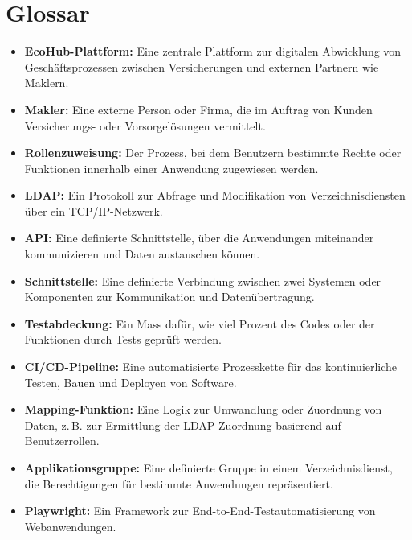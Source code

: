 \chapter*{Glossar}
\vspace{-5em}
\begin{itemize}
  \item \textbf{EcoHub-Plattform:} Eine zentrale Plattform zur digitalen Abwicklung von Geschäftsprozessen zwischen Versicherungen und externen Partnern wie Maklern.
  
  \item \textbf{Makler:} Eine externe Person oder Firma, die im Auftrag von Kunden Versicherungs- oder Vorsorgelösungen vermittelt.

  \item \textbf{Rollenzuweisung:} Der Prozess, bei dem Benutzern bestimmte Rechte oder Funktionen innerhalb einer Anwendung zugewiesen werden.

  \item \textbf{LDAP:} Ein Protokoll zur Abfrage und Modifikation von Verzeichnisdiensten über ein TCP/IP-Netzwerk.

  \item \textbf{API:} Eine definierte Schnittstelle, über die Anwendungen miteinander kommunizieren und Daten austauschen können.

  \item \textbf{Schnittstelle:} Eine definierte Verbindung zwischen zwei Systemen oder Komponenten zur Kommunikation und Datenübertragung.

  \item \textbf{Testabdeckung:} Ein Mass dafür, wie viel Prozent des Codes oder der Funktionen durch Tests geprüft werden.

  \item \textbf{CI/CD-Pipeline:} Eine automatisierte Prozesskette für das kontinuierliche Testen, Bauen und Deployen von Software.

  \item \textbf{Mapping-Funktion:} Eine Logik zur Umwandlung oder Zuordnung von Daten, z.\,B. zur Ermittlung der LDAP-Zuordnung basierend auf Benutzerrollen.

  \item \textbf{Applikationsgruppe:} Eine definierte Gruppe in einem Verzeichnisdienst, die Berechtigungen für bestimmte Anwendungen repräsentiert.

  \item \textbf{Playwright:} Ein Framework zur End-to-End-Testautomatisierung von Webanwendungen.


\end{itemize}
